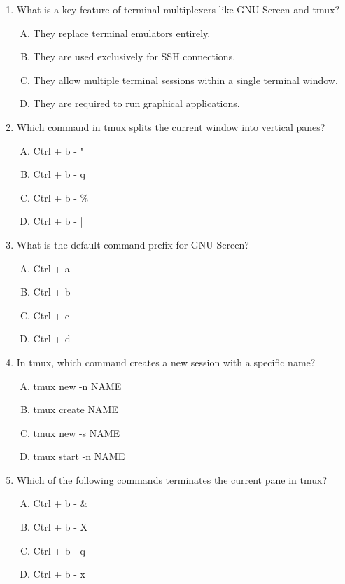 \documentclass[a4paper]{report}
\begin{document}
\begin{enumerate}[1.]
    \item What is a key feature of terminal multiplexers like GNU Screen and tmux?  
    \begin{enumerate}[A)]
        \item They replace terminal emulators entirely.  
        \item They are used exclusively for SSH connections.  
        \item They allow multiple terminal sessions within a single terminal window.  
        \item They are required to run graphical applications.  
    \end{enumerate}

    \item Which command in tmux splits the current window into vertical panes?  
    \begin{enumerate}[A)]
        \item Ctrl + b - "  
        \item Ctrl + b - q  
        \item Ctrl + b - \%  
        \item Ctrl + b - |  
    \end{enumerate}

    \item What is the default command prefix for GNU Screen?  
    \begin{enumerate}[A)]
        \item Ctrl + a  
        \item Ctrl + b  
        \item Ctrl + c  
        \item Ctrl + d  
    \end{enumerate}

    \item In tmux, which command creates a new session with a specific name?  
    \begin{enumerate}[A)]
        \item tmux new -n NAME  
        \item tmux create NAME  
        \item tmux new -s NAME  
        \item tmux start -n NAME  
    \end{enumerate}

    \item Which of the following commands terminates the current pane in tmux?  
    \begin{enumerate}[A)]
        \item Ctrl + b - \&  
        \item Ctrl + b - X  
        \item Ctrl + b - q  
        \item Ctrl + b - x  
    \end{enumerate}


\end{enumerate}
\end{document}
